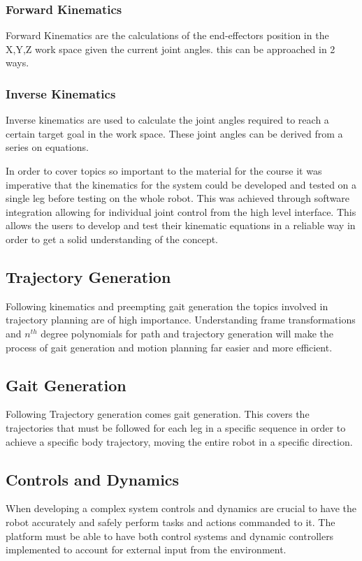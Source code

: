 \documentclass[12pt]{report}
\begin{document}
        \subsubsection{Forward Kinematics}
            Forward Kinematics are the calculations of the end-effectors position in the X,Y,Z work space given the current joint angles. this can be approached in 2 ways.
            
        \subsubsection{Inverse Kinematics}
            Inverse kinematics are used to calculate the joint angles required to reach a certain target goal in the work space. These joint angles can be derived from a series on equations.
           
    In order to cover topics so important to the material for the course it was imperative that the kinematics for the system could be developed and tested on a single leg before testing on the whole robot. This was achieved through software integration allowing for individual joint control from the high level interface. This allows the users to develop and test their kinematic equations in a reliable way in order to get a solid understanding of the concept.
    
    \subsection{Trajectory Generation}
     Following kinematics and preempting gait generation the topics involved in trajectory planning are of high importance. Understanding frame transformations and $n^{th}$ degree polynomials for path and trajectory generation will make the process of gait generation and motion planning far easier and more efficient. 
    
    \subsection{Gait Generation}
     Following Trajectory generation comes gait generation. This covers the trajectories that must be followed for each leg in a specific sequence in order to achieve a specific body trajectory, moving the entire robot in a specific direction.
    
    \subsection{Controls and Dynamics}
      When developing a complex system controls and dynamics are crucial to have the robot accurately and safely perform tasks and actions commanded to it. The platform must be able to have both control systems and dynamic controllers implemented to account for external input from the environment.
\end{document}
